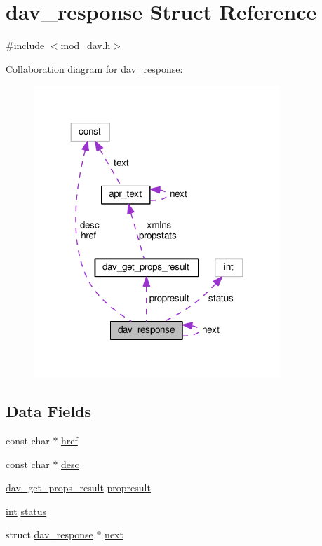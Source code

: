 \hypertarget{structdav__response}{}\section{dav\+\_\+response Struct Reference}
\label{structdav__response}


{\ttfamily \#include $<$mod\+\_\+dav.\+h$>$}



Collaboration diagram for dav\+\_\+response\+:
\nopagebreak
\begin{figure}[H]
\begin{center}
\leavevmode
\includegraphics[width=263pt]{structdav__response__coll__graph}
\end{center}
\end{figure}
\subsection*{Data Fields}
\begin{DoxyCompactItemize}
\item 
const char $\ast$ \hyperlink{structdav__response_af47dec46cb0ceb183f37cc80f88ca1cb}{href}
\item 
const char $\ast$ \hyperlink{structdav__response_ab6f18a6e053b1d8573a73a2bdc574b47}{desc}
\item 
\hyperlink{structdav__get__props__result}{dav\+\_\+get\+\_\+props\+\_\+result} \hyperlink{structdav__response_a4dde6c59f8785f50dbda7c5fca30bdda}{propresult}
\item 
\hyperlink{pcre_8txt_a42dfa4ff673c82d8efe7144098fbc198}{int} \hyperlink{structdav__response_a1f3a9d628d4b90ac90fb11c34d0286a0}{status}
\item 
struct \hyperlink{structdav__response}{dav\+\_\+response} $\ast$ \hyperlink{structdav__response_abe3d46f02938b45865ccf10e228b5a38}{next}
\end{DoxyCompactItemize}


